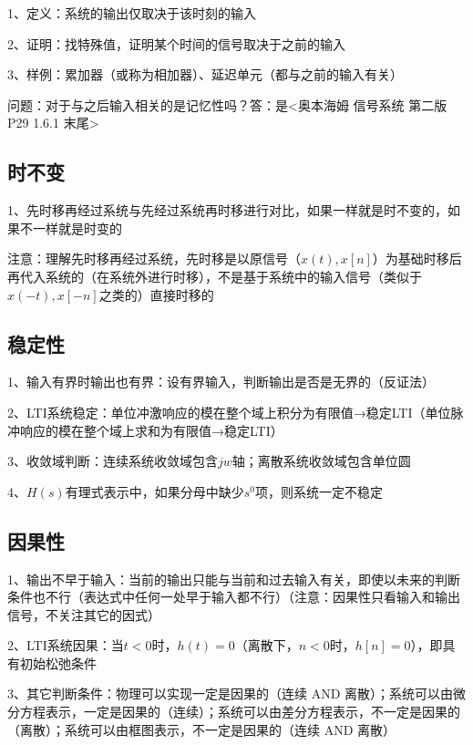 1、定义：系统的输出仅取决于该时刻的输入

2、证明：找特殊值，证明某个时间的信号取决于之前的输入

3、样例：累加器（或称为相加器）、延迟单元（都与之前的输入有关）

问题：对于与之后输入相关的是记忆性吗？答：是<奥本海姆 信号系统 第二版 P29 1.6.1 末尾>



\subsection{时不变}

1、先时移再经过系统与先经过系统再时移进行对比，如果一样就是时不变的，如果不一样就是时变的

注意：理解先时移再经过系统，先时移是以原信号（$x(t),x[n]$）为基础时移后再代入系统的（在系统外进行时移），不是基于系统中的输入信号（类似于$x(-t),x[-n]$之类的）直接时移的



\subsection{稳定性}

1、输入有界时输出也有界：设有界输入，判断输出是否是无界的（反证法）

2、LTI系统稳定：单位冲激响应的模在整个域上积分为有限值→稳定LTI（单位脉冲响应的模在整个域上求和为有限值→稳定LTI）

3、收敛域判断：连续系统收敛域包含$jw$轴；离散系统收敛域包含单位圆

4、$H(s)$有理式表示中，如果分母中缺少$s^0$项，则系统一定不稳定



\subsection{因果性}

1、输出不早于输入：当前的输出只能与当前和过去输入有关，即使以未来的判断条件也不行（表达式中任何一处早于输入都不行）（注意：因果性只看输入和输出信号，不关注其它的因式）

2、LTI系统因果：当$t<0$时，$h(t)=0$（离散下，$n<0$时，$h[n]=0$），即具有初始松弛条件

3、其它判断条件：物理可以实现一定是因果的（连续 AND 离散）；系统可以由微分方程表示，一定是因果的（连续）；系统可以由差分方程表示，不一定是因果的（离散）；系统可以由框图表示，不一定是因果的（连续 AND 离散）

